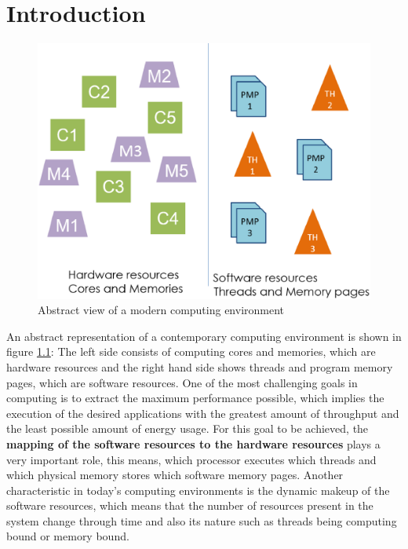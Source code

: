 \chapter{Introduction}\label{chapter:intro}

\begin{figure}[ht]
	\centering
		\includegraphics[width=.6\textwidth]{figures/abstract-env.eps}
		\caption[Abstract view of a modern computing environment]{Abstract view of a modern computing environment}
		\label{fig:abstract-cmpenv}
\end{figure}

An abstract representation of a contemporary computing environment is shown in figure \ref{fig:abstract-cmpenv}: The left side consists of computing cores and memories, which are hardware resources and the right hand side shows threads and program memory pages, which are software resources. One of the most challenging goals in computing is to extract the maximum performance possible, which implies the execution of the desired applications with the greatest amount of throughput and the least possible amount of energy usage. For this goal to be achieved, the \textbf{mapping of the software resources to the hardware resources} plays a very important role, this means, which processor executes which threads and which physical memory stores which software memory pages. Another characteristic in today's computing environments is the dynamic makeup of the software resources, which means that the number of resources present in the system change through time and also its nature such as threads being computing bound or memory bound. 

